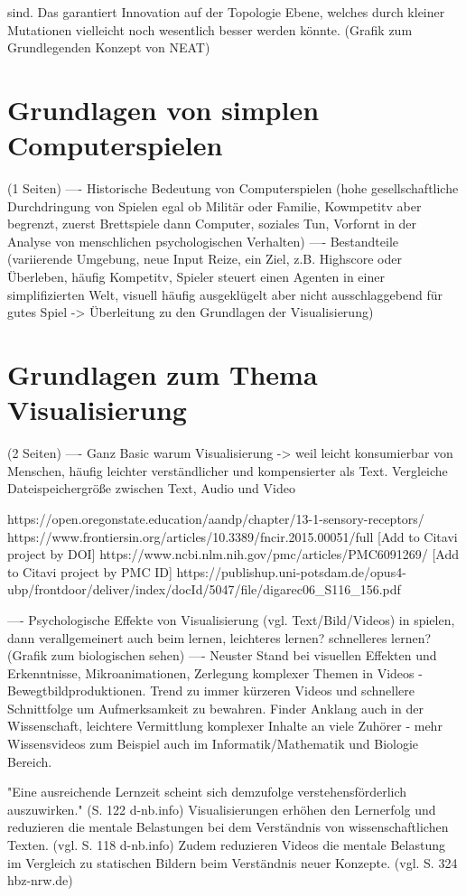 sind. Das garantiert Innovation auf der Topologie Ebene, welches durch kleiner Mutationen vielleicht noch wesentlich besser werden könnte. (Grafik zum Grundlegenden Konzept von NEAT)

\section{Grundlagen von simplen Computerspielen}
(1 Seiten)
---- Historische Bedeutung von Computerspielen (hohe gesellschaftliche Durchdringung von Spielen egal ob Militär oder Familie, Kowmpetitv aber begrenzt, zuerst Brettspiele dann Computer, soziales Tun, Vorfornt in der Analyse von menschlichen psychologischen Verhalten)
---- Bestandteile (variierende Umgebung, neue Input Reize, ein Ziel, z.B. Highscore oder Überleben, häufig Kompetitv, Spieler steuert einen Agenten in einer simplifizierten Welt, visuell häufig ausgeklügelt aber nicht ausschlaggebend für gutes Spiel -> Überleitung zu den Grundlagen der Visualisierung)

\section{Grundlagen zum Thema Visualisierung}
(2 Seiten)
---- Ganz Basic warum Visualisierung -> weil leicht konsumierbar von Menschen, häufig leichter verständlicher und kompensierter als Text. Vergleiche Dateispeichergröße zwischen Text, Audio und Video 

https://open.oregonstate.education/aandp/chapter/13-1-sensory-receptors/
https://www.frontiersin.org/articles/10.3389/fncir.2015.00051/full  [Add to Citavi project by DOI] 
https://www.ncbi.nlm.nih.gov/pmc/articles/PMC6091269/  [Add to Citavi project by PMC ID] 
https://publishup.uni-potsdam.de/opus4-ubp/frontdoor/deliver/index/docId/5047/file/digarec06\_S116\_156.pdf


---- Psychologische Effekte von Visualisierung (vgl. Text/Bild/Videos) in spielen, dann verallgemeinert auch beim lernen, leichteres lernen? schnelleres lernen? (Grafik zum biologischen sehen) 
---- Neuster Stand bei visuellen Effekten und Erkenntnisse, Mikroanimationen, Zerlegung komplexer Themen in Videos - Bewegtbildproduktionen. Trend zu immer kürzeren Videos und schnellere Schnittfolge um Aufmerksamkeit zu bewahren. Finder Anklang auch in der Wissenschaft, leichtere Vermittlung komplexer Inhalte an viele Zuhörer - mehr Wissensvideos zum Beispiel auch im Informatik/Mathematik und Biologie Bereich. 

"Eine ausreichende Lernzeit scheint sich
demzufolge verstehensförderlich auszuwirken." (S. 122 d-nb.info)
Visualisierungen erhöhen den Lernerfolg und reduzieren die mentale Belastungen bei dem Verständnis von wissenschaftlichen Texten. (vgl. S. 118 d-nb.info)
Zudem reduzieren Videos die mentale Belastung im Vergleich zu statischen Bildern beim Verständnis neuer Konzepte. (vgl. S. 324 hbz-nrw.de)


